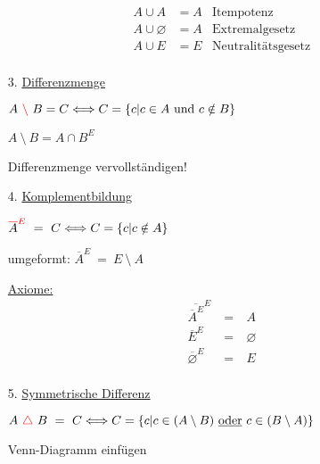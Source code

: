 \begin{itemize}[leftmargin=*]
\begin{align*}
                        A \cup A &= A & \text{Itempotenz} \\
                        A \cup \varnothing &= A & \text{Extremalgesetz} \\
                        A \cup E &= E & \text{Neutralitätsgesetz} \\
                        \end{align*}
                    \item[3.] \underline{Differenzmenge}
                    \item[] $A \ \textcolor{red}{\setminus} \ B = C \Longleftrightarrow C = \{c|c \in A ~\text{und}~ c \notin B \}$
                    \item[] $A \ \setminus \ B = A \cap B^E$
                    \item[] Differenzmenge vervollständigen!   
                    \item[4.] \underline{Komplementbildung}
                    \item[] $\textcolor{red}{\overline{\textcolor{black}{A}}^E} \ = \ C \Longleftrightarrow C = \{c|c \notin A \}$
                    \item[] umgeformt: $\overline{A}^E \ = \ E \ \setminus \ A$
                    \item[] \underline{Axiome:} \begin{eqnarray*}
                            \overline{\overline{A}^E}^E \ &=& \ A \\
                            \overline{E}^E \ &=& \ \varnothing \\
                            \overline{\varnothing}^E \ &=& \ E \\
                        \end{eqnarray*}
                    \item[5.] \underline{Symmetrische Differenz}
                    \item[] $A \ \textcolor{red}{\triangle} \ B \ = \ C \Longleftrightarrow C = \{c|c \in (A \setminus B) ~\text{\underline{oder}}~ c \in (B     \setminus A)\}$
                    \item[] Venn-Diagramm einfügen
                \end{itemize} 
            
                      
